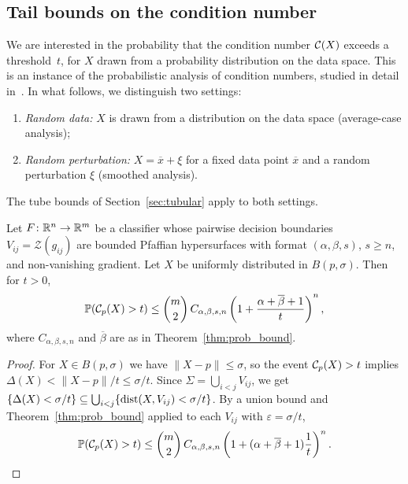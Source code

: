 \subsection{Tail bounds on the condition number}
We are interested in the probability that the condition number $\mathcal{C}(X)$ exceeds a threshold~$t$, for $X$ drawn from a probability distribution on the data space. This is an instance of the probabilistic analysis of condition numbers, studied in detail in~\cite{burgisser2013condition}. In what follows, we distinguish two settings:
\begin{enumerate}
\item \emph{Random data:} $X$ is drawn from a distribution on the data space (average-case analysis);
\item \emph{Random perturbation:} $X = \overline{x} + \xi$ for a fixed data point $\overline{x}$ and a random perturbation $\xi$ (smoothed analysis).
\end{enumerate}
The tube bounds of Section~\ref{sec:tubular} apply to both settings.

\begin{theorem}\label{thm:condition-uniform}
Let $F\colon \mathbb{R}^n \to \mathbb{R}^m$ be a classifier whose pairwise decision boundaries $V_{ij} = \mathcal{Z}(g_{ij})$ are bounded Pfaffian hypersurfaces with format $(\alpha, \beta, s)$, $s\geq n$, and non-vanishing gradient. Let $X$ be uniformly distributed in $B(p, \sigma)$. Then for $t > 0$,
\begin{equation*}
  \mathbb{P}(\mathcal{C}_p(X) > t) \leq \binom{m}{2}\, C_{\alpha,\beta,s,n}\left(1 + \frac{\alpha + \overline{\beta} + 1}{t}\right)^n,
\end{equation*}
where $C_{\alpha,\beta,s,n}$ and $\overline{\beta}$ are as in Theorem~\ref{thm:prob_bound}.
\end{theorem}

\begin{proof}
  For $X\in B(p,\sigma)$ we have $\|X - p\|\leq \sigma$, so the event $\mathcal{C}_p(X) > t$ implies $\Delta(X) < \|X-p\|/t \leq \sigma/t$. Since $\Sigma = \bigcup_{i<j}V_{ij}$, we get $\{\Delta(X) < \sigma/t\} \subseteq \bigcup_{i<j}\{\operatorname{dist}(X, V_{ij}) < \sigma/t\}$. By a union bound and Theorem~\ref{thm:prob_bound} applied to each $V_{ij}$ with $\varepsilon = \sigma/t$,
\begin{equation*}
  \mathbb{P}(\mathcal{C}_p(X) > t) \leq \binom{m}{2}\, C_{\alpha,\beta,s,n}\left(1 + (\alpha + \overline{\beta} + 1)\frac{1}{t}\right)^n. \qedhere
\end{equation*}
\end{proof}

